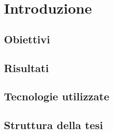 \chapter{Introduzione}

\section{Obiettivi} %

\section{Risultati}

\section{Tecnologie utilizzate}

\section{Struttura della tesi}
